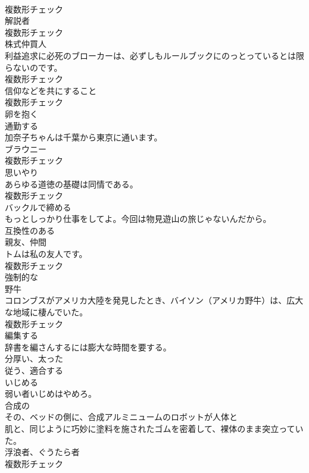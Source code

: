 \documentclass[8pt]{extreport}
\begin{document}
\begin{CJK}{UTF8}{min}
\\	複数形チェック
\\	[名詞]	解説者	
\\	複数形チェック
\\	[名詞]	株式仲買人	
\\	利益追求に必死のブローカーは、必ずしもルールブックにのっとっているとは限らないのです。	
\\	複数形チェック
\\	[名詞]	信仰などを共にすること	
\\	複数形チェック
\\	[動詞]	卵を抱く	
\\	[動詞]	通勤する	
\\	加奈子ちゃんは千葉から東京に通います。	
\\	[名詞]	ブラウニー	
\\	複数形チェック
\\	[名詞]	思いやり	
\\	あらゆる道徳の基礎は同情である。	
\\	複数形チェック
\\	[動詞]	バックルで締める	
\\	もっとしっかり仕事をしてよ。今回は物見遊山の旅じゃないんだから。	
\\	[形容詞]	互換性のある	
\\	[名詞]	親友、仲間	
\\	トムは私の友人です。	
\\	複数形チェック
\\	[形容詞]	強制的な	
\\	[名詞]	野牛	
\\	コロンブスがアメリカ大陸を発見したとき、バイソン（アメリカ野牛）は、広大な地域に棲んでいた。	
\\	複数形チェック
\\	[動詞]	編集する	
\\	辞書を編さんするには膨大な時間を要する。	
\\	[形容詞]	分厚い、太った	
\\	[動詞]	従う、適合する	
\\	[動詞]	いじめる	
\\	弱い者いじめはやめろ。	
\\	[形容詞]	合成の	
\\	その、ベッドの側に、合成アルミニュームのロボットが人体と
\\	肌と、同じように巧妙に塗料を施されたゴムを密着して、裸体のまま突立っていた。	
\\	[名詞]	浮浪者、ぐうたら者	
\\	複数形チェック

\end{CJK}
\end{document}
